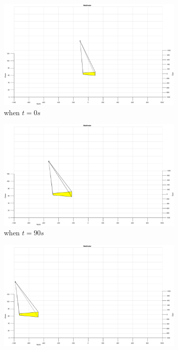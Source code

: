 \begin{figure}
	\centering
	\begin{subfigure}[b]{0.32\linewidth}
		\includegraphics[width=\textwidth]{images/chapter4/image_UAV_-5mps}
		\caption{when $t=0s$}
	\end{subfigure}
	\begin{subfigure}[b]{0.32\linewidth}
		\includegraphics[width=\textwidth]{images/chapter4/image_UAV_-5mps_90s}
		\caption{when $t=90s$}
	\end{subfigure}
	\begin{subfigure}[b]{0.32\linewidth}
		\includegraphics[width=\textwidth]{images/chapter4/image_UAV_-5mps_180s}

\end{subfigure}
\end{figure}
